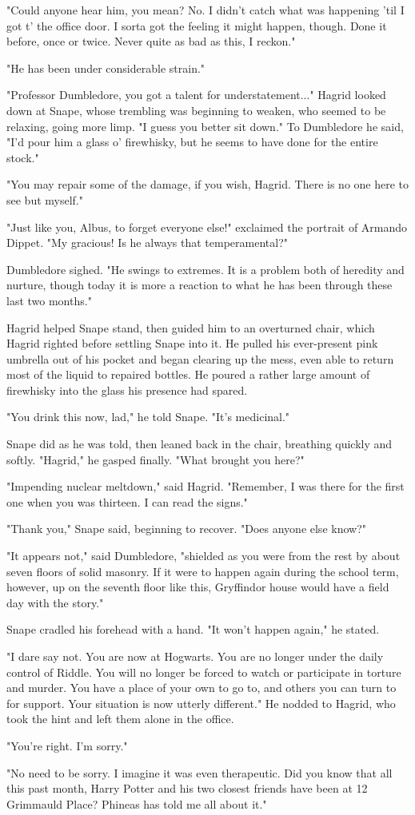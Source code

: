"Could anyone hear him, you mean? No. I didn't catch what was happening 'til I got t' the office door. I sorta got the feeling it might happen, though. Done it before, once or twice. Never quite as bad as this, I reckon."

"He has been under considerable strain."

"Professor Dumbledore, you got a talent for understatement..." Hagrid looked down at Snape, whose trembling was beginning to weaken, who seemed to be relaxing, going more limp. "I guess you better sit down." To Dumbledore he said, "I'd pour him a glass o' firewhisky, but he seems to have done for the entire stock."

"You may repair some of the damage, if you wish, Hagrid. There is no one here to see but myself."

"Just like you, Albus, to forget everyone else!" exclaimed the portrait of Armando Dippet. "My gracious! Is he always that temperamental?"

Dumbledore sighed. "He swings to extremes. It is a problem both of heredity and nurture, though today it is more a reaction to what he has been through these last two months."

Hagrid helped Snape stand, then guided him to an overturned chair, which Hagrid righted before settling Snape into it. He pulled his ever-present pink umbrella out of his pocket and began clearing up the mess, even able to return most of the liquid to repaired bottles. He poured a rather large amount of firewhisky into the glass his presence had spared.

"You drink this now, lad," he told Snape. "It's medicinal."

Snape did as he was told, then leaned back in the chair, breathing quickly and softly. "Hagrid," he gasped finally. "What brought you here?"

"Impending nuclear meltdown," said Hagrid. "Remember, I was there for the first one when you was thirteen. I can read the signs."

"Thank you," Snape said, beginning to recover. "Does anyone else know?"

"It appears not," said Dumbledore, "shielded as you were from the rest by about seven floors of solid masonry. If it were to happen again during the school term, however, up on the seventh floor like this, Gryffindor house would have a field day with the story."

Snape cradled his forehead with a hand. "It won't happen again," he stated.

"I dare say not. You are now at Hogwarts. You are no longer under the daily control of Riddle. You will no longer be forced to watch or participate in torture and murder. You have a place of your own to go to, and others you can turn to for support. Your situation is now utterly different." He nodded to Hagrid, who took the hint and left them alone in the office.

"You're right. I'm sorry."

"No need to be sorry. I imagine it was even therapeutic. Did you know that all this past month, Harry Potter and his two closest friends have been at 12 Grimmauld Place? Phineas has told me all about it." 


